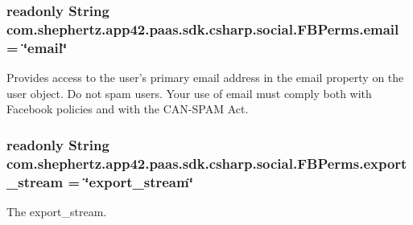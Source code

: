 \hypertarget{classcom_1_1shephertz_1_1app42_1_1paas_1_1sdk_1_1csharp_1_1social_1_1_f_b_perms_a2f53c88b1fba56a51f956afd0b84b7aa}{
\subsubsection[{email}]{\setlength{\rightskip}{0pt plus 5cm}readonly String com.\+shephertz.\+app42.\+paas.\+sdk.\+csharp.\+social.\+F\+B\+Perms.\+email = \char`\"{}email\char`\"{}\hspace{0.3cm}{\ttfamily [static]}}}\label{classcom_1_1shephertz_1_1app42_1_1paas_1_1sdk_1_1csharp_1_1social_1_1_f_b_perms_a2f53c88b1fba56a51f956afd0b84b7aa}


Provides access to the user's primary email address in the email property on the user object. Do not spam users. Your use of email must comply both with Facebook policies and with the C\+A\+N-\/\+S\+P\+A\+M Act. 

\hypertarget{classcom_1_1shephertz_1_1app42_1_1paas_1_1sdk_1_1csharp_1_1social_1_1_f_b_perms_ad850fb5a237f39159f6eac38d3c0e9d6}{
\subsubsection[{export\+\_\+stream}]{\setlength{\rightskip}{0pt plus 5cm}readonly String com.\+shephertz.\+app42.\+paas.\+sdk.\+csharp.\+social.\+F\+B\+Perms.\+export\+\_\+stream = \char`\"{}export\+\_\+stream\char`\"{}\hspace{0.3cm}{\ttfamily [static]}}}\label{classcom_1_1shephertz_1_1app42_1_1paas_1_1sdk_1_1csharp_1_1social_1_1_f_b_perms_ad850fb5a237f39159f6eac38d3c0e9d6}


The export\+\_\+stream. 

